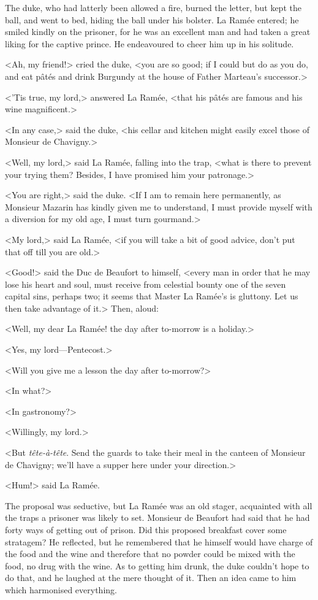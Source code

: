 The duke, who had latterly been allowed a fire, burned the letter, but kept the ball, and went to bed, hiding the ball under his bolster. La Ramée entered; he smiled kindly on the prisoner, for he was an excellent man and had taken a great liking for the captive prince. He endeavoured to cheer him up in his solitude.

<Ah, my friend!> cried the duke, <you are so good; if I could but do as you do, and eat pâtés and drink Burgundy at the house of Father Marteau's successor.>

<'Tis true, my lord,> answered La Ramée, <that his pâtés are famous and his wine magnificent.>

<In any case,> said the duke, <his cellar and kitchen might easily excel those of Monsieur de Chavigny.>

<Well, my lord,> said La Ramée, falling into the trap, <what is there to prevent your trying them? Besides, I have promised him your patronage.>

<You are right,> said the duke. <If I am to remain here permanently, as Monsieur Mazarin has kindly given me to understand, I must provide myself with a diversion for my old age, I must turn gourmand.>

<My lord,> said La Ramée, <if you will take a bit of good advice, don't put that off till you are old.>

<Good!> said the Duc de Beaufort to himself, <every man in order that he may lose his heart and soul, must receive from celestial bounty one of the seven capital sins, perhaps two; it seems that Master La Ramée's is gluttony. Let us then take advantage of it.> Then, aloud:

<Well, my dear La Ramée! the day after to-morrow is a holiday.>

<Yes, my lord—Pentecost.>

<Will you give me a lesson the day after to-morrow?>

<In what?>

<In gastronomy?>

<Willingly, my lord.>

<But \textit{tête-à-tête}. Send the guards to take their meal in the canteen of Monsieur de Chavigny; we'll have a supper here under your direction.>

<Hum!> said La Ramée.

The proposal was seductive, but La Ramée was an old stager, acquainted with all the traps a prisoner was likely to set. Monsieur de Beaufort had said that he had forty ways of getting out of prison. Did this proposed breakfast cover some stratagem? He reflected, but he remembered that he himself would have charge of the food and the wine and therefore that no powder could be mixed with the food, no drug with the wine. As to getting him drunk, the duke couldn't hope to do that, and he laughed at the mere thought of it. Then an idea came to him which harmonised everything.

